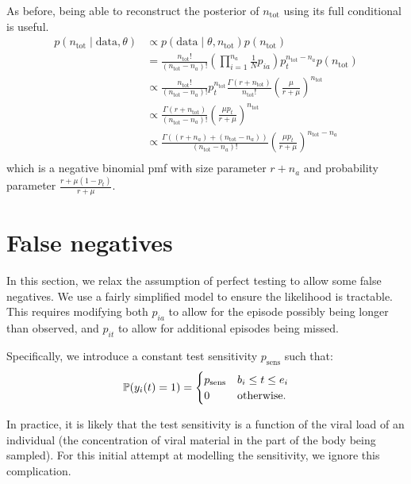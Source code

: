 \documentclass[main.tex]{subfiles}
\begin{document}
As before, being able to reconstruct the posterior of $n_\text{tot}$
using its full conditional is useful.
\begin{align}
p(n_\text{tot} \mid \text{data}, \theta)
&\propto p(\text{data} \mid \theta, n_\text{tot}) p(n_\text{tot}) \\
&= \frac{n_\text{tot}!}{(n_\text{tot}-n_a)!} \left( \prod_{i=1}^{n_a} \frac{1}{N} p_{ia} \right) p_t^{n_\text{tot}-n_a} p(n_\text{tot}) \\
&\propto \frac{n_\text{tot}!}{(n_\text{tot}-n_a)!} p_t^{n_\text{tot}} \frac{\Gamma(r + n_\text{tot})}{n_\text{tot}!} \left( \frac{\mu}{r + \mu} \right)^{n_\text{tot}}  \\
&\propto \frac{\Gamma(r + n_\text{tot})}{(n_\text{tot}-n_a)!} \left( \frac{\mu p_t}{r + \mu} \right)^{n_\text{tot}}  \\
&\propto \frac{\Gamma((r + n_a) + (n_\text{tot}- n_a))}{(n_\text{tot}-n_a)!} \left( \frac{\mu p_t}{r + \mu} \right)^{n_\text{tot}-n_a}  \\
\end{align}
which is a negative binomial pmf with size parameter $r + n_a$ and
probability parameter $\frac{r+\mu(1-p_t)}{r+\mu}$.

\section{False negatives}\label{false-negatives}

In this section, we relax the assumption of perfect testing to allow
some false negatives. We use a fairly simplified model to ensure the
likelihood is tractable. This requires modifying both $p_{ia}$ to
allow for the episode possibly being longer than observed, and
$p_{it}$ to allow for additional episodes being missed.

Specifically, we introduce a constant test sensitivity $p_\text{sens}$
such that:
\begin{align}
\operatorname{\mathbb{P}}(y_i(t) = 1) = \begin{cases} p_\text{sens} &b_i \leq t \leq e_i \\ 0 &\text{otherwise.}\end{cases}
\end{align}

In practice, it is likely that the test sensitivity is a function of the
viral load of an individual (the concentration of viral material in the
part of the body being sampled). For this initial attempt at modelling
the sensitivity, we ignore this complication.
\end{document}
